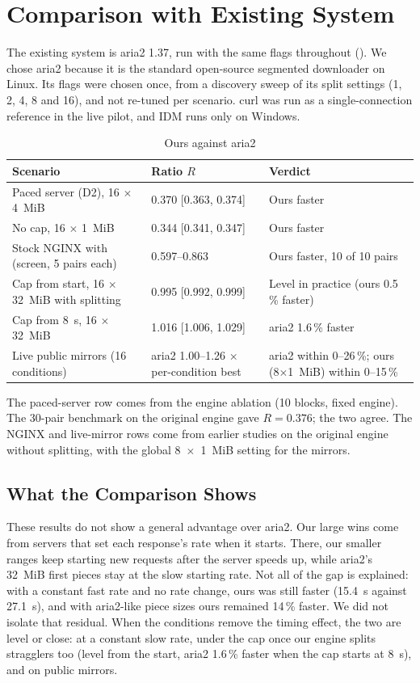 \chapter{Comparison with Existing System}
The existing system is aria2 1.37, run with the same flags throughout (). We chose aria2 because it is the standard open-source segmented downloader on Linux. Its flags were chosen once, from a discovery sweep of its split settings (1, 2, 4, 8 and 16), and not re-tuned per scenario. curl was run as a single-connection reference in the live pilot, and IDM runs only on Windows.

\begin{table}[H]\centering
\caption{Ours against aria2}\label{tab:aria2}
\begin{tabularx}{\linewidth}{@{}LlL@{}}
\toprule
\textbf{Scenario} & \textbf{Ratio $R$} & \textbf{Verdict}\\
\midrule
Paced server (D2), 16 $\times$ 4~MiB & 0.370 [0.363, 0.374] & Ours faster\\
No cap, 16 $\times$ 1~MiB & 0.344 [0.341, 0.347] & Ours faster\\
Stock NGINX with  (screen, 5 pairs each) & 0.597--0.863 & Ours faster, 10 of 10 pairs\\
Cap from start, 16 $\times$ 32~MiB with splitting & 0.995 [0.992, 0.999] & Level in practice (ours 0.5\,\% faster)\\
Cap from 8~s, 16 $\times$ 32~MiB & 1.016 [1.006, 1.029] & aria2 1.6\,\% faster\\
Live public mirrors (16 conditions) & aria2 1.00--1.26 $\times$ per-condition best & aria2 within 0--26\,\%; ours (8$\times$1~MiB) within 0--15\,\%\\
\bottomrule
\end{tabularx}
\end{table}

The paced-server row comes from the engine ablation (10 blocks, fixed engine). The 30-pair benchmark on the original engine gave $R = 0.376$; the two agree. The NGINX and live-mirror rows come from earlier studies on the original engine without splitting, with the global 8~$\times$~1~MiB setting for the mirrors.

\section{What the Comparison Shows}
These results do not show a general advantage over aria2. Our large wins come from servers that set each response's rate when it starts. There, our smaller ranges keep starting new requests after the server speeds up, while aria2's 32~MiB first pieces stay at the slow starting rate. Not all of the gap is explained: with a constant fast rate and no rate change, ours was still faster (15.4~s against 27.1~s), and with aria2-like piece sizes ours remained 14\,\% faster. We did not isolate that residual. When the conditions remove the timing effect, the two are level or close: at a constant slow rate, under the cap once our engine splits stragglers too (level from the start, aria2 1.6\,\% faster when the cap starts at 8~s), and on public mirrors.


